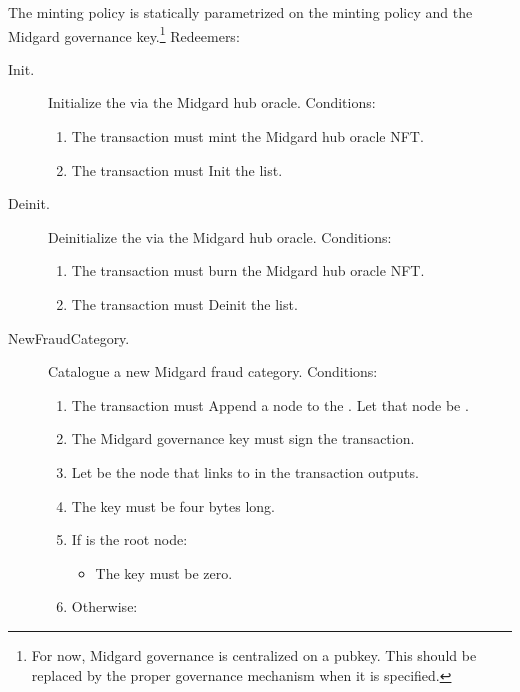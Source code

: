 \documentclass[../midgard.tex]{subfiles}
\begin{document}
The  minting policy is statically parametrized on the  minting policy and the Midgard governance key.\footnote{For now, Midgard governance is centralized on a pubkey. This should be replaced by the proper governance mechanism when it is specified.} Redeemers:
\begin{description}
    \item[Init.] Initialize the  via the Midgard hub oracle. Conditions:
        \begin{enumerate}
            \item The transaction must mint the Midgard hub oracle NFT.
            \item The transaction must Init the  list.
        \end{enumerate}
    \item[Deinit.] Deinitialize the  via the Midgard hub oracle. Conditions:
        \begin{enumerate}
            \item The transaction must burn the Midgard hub oracle NFT.
            \item The transaction must Deinit the  list.
        \end{enumerate}
    \item[NewFraudCategory.] Catalogue a new Midgard fraud category. Conditions:
        \begin{enumerate}
            \item The transaction must Append a node to the . Let that node be .
            \item The Midgard governance key must sign the transaction.
            \item Let  be the node that links to  in the transaction outputs.
            \item The  key must be four bytes long.
            \item If  is the root node:
                \begin{itemize}
                    \item The  key must be zero.
                \end{itemize}
            \item Otherwise:
                \begin{itemize}

\end{itemize}
\end{enumerate}
\end{description}
\end{document}

